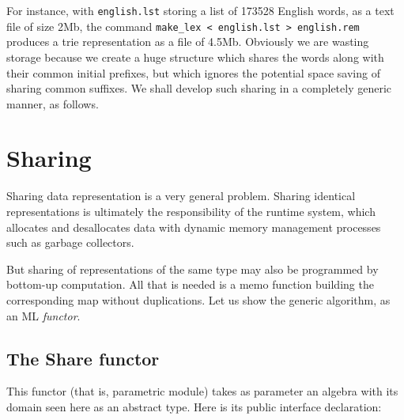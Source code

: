 \vspace*{15pt}

For instance, with \verb:english.lst: storing a list of 173528 English
words, as a text file of size 2Mb, the command
\verb:make_lex < english.lst > english.rem:
produces a trie representation as a file of 4.5Mb. Obviously
we are wasting storage because we create a huge structure which shares
the words along with their common initial prefixes, but which ignores the
potential space saving of sharing common suffixes. We shall develop
such sharing in a completely generic manner, as follows. 

\section{Sharing}
\label{sharing}

Sharing data representation is a very general problem. 
Sharing identical representations is ultimately the responsibility of
the runtime system, which allocates and desallocates data with dynamic memory
management processes such as garbage collectors. 

But sharing of representations of the same type may also be programmed by 
bottom-up computation. All that is needed is a memo function building the 
corresponding map without duplications.
Let us show the generic algorithm, as an ML {\sl functor}.


\subsection{The Share functor}

This functor (that is, parametric module) takes as parameter an algebra
with its domain seen here as an abstract type. Here is its public interface
declaration:

